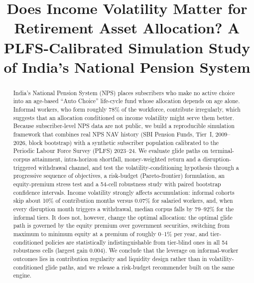 \documentclass[conference]{IEEEtran}
\begin{document}
\title{Does Income Volatility Matter for Retirement Asset Allocation? A PLFS-Calibrated Simulation Study of India's National Pension System}

\author{
\and
{}
\and
{}
}

\maketitle

\begin{abstract}
India's National Pension System (NPS) places subscribers who make no active choice into an age-based ``Auto Choice'' life-cycle fund whose allocation depends on age alone. Informal workers, who form roughly 78\% of the workforce, contribute irregularly, which suggests that an allocation conditioned on income volatility might serve them better. Because subscriber-level NPS data are not public, we build a reproducible simulation framework that combines real NPS NAV history (SBI Pension Funds, Tier~I, 2009--2026, block bootstrap) with a synthetic subscriber population calibrated to the Periodic Labour Force Survey (PLFS) 2023--24. We evaluate glide paths on terminal-corpus attainment, intra-horizon shortfall, money-weighted return and a disruption-triggered withdrawal channel, and test the volatility-conditioning hypothesis through a progressive sequence of objectives, a risk-budget (Pareto-frontier) formulation, an equity-premium stress test and a 54-cell robustness study with paired bootstrap confidence intervals. Income volatility strongly affects accumulation: informal cohorts skip about 10\% of contribution months versus 0.07\% for salaried workers, and, when every disruption month triggers a withdrawal, median corpus falls by 79--92\% for the informal tiers. It does not, however, change the optimal allocation: the optimal glide path is governed by the equity premium over government securities, switching from maximum to minimum equity at a premium of roughly 0--1\% per year, and tier-conditioned policies are statistically indistinguishable from tier-blind ones in all 54 robustness cells (largest gain 0.004). We conclude that the leverage on informal-worker outcomes lies in contribution regularity and liquidity design rather than in volatility-conditioned glide paths, and we release a risk-budget recommender built on the same engine.
\end{abstract}
\end{document}
